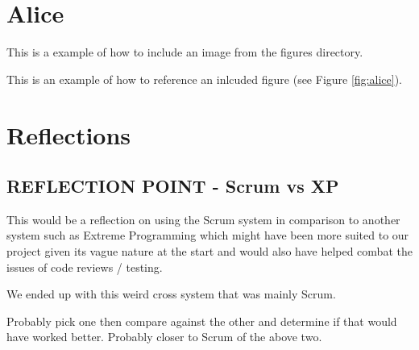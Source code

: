 \documentclass{l3proj}
\begin{document}

\section{Alice}
\label{sec:alice}

This is a example of how to include an image from the figures directory.



This is an example of how to reference an inlcuded figure (see Figure \ref{fig:alice}).

\section{Reflections}
\label{sec:reflections}


\subsection{REFLECTION POINT - Scrum vs XP}
\label{scrumvsxp}
This would be a reflection on using the Scrum system in comparison to another system such as Extreme Programming which might have been more suited to our project given its vague nature at the start and would also have helped combat the issues of code reviews / testing.

We ended up with this weird cross system that was mainly Scrum.

Probably pick one then compare against the other and determine if that would have worked better. Probably closer to Scrum of the above two.
\end{document}
